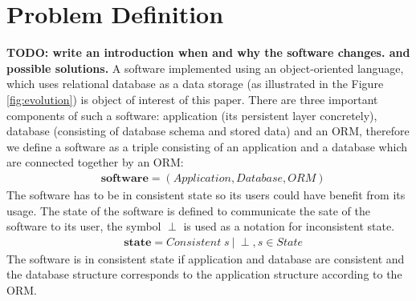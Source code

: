 \documentclass[11pt]{article}
\begin{document}
\section{Problem Definition} 
\label{sec:problem}
\textbf{TODO: write an introduction when and why the software changes. and possible solutions.}
A software implemented using an object-oriented language, which uses relational database as a data storage (as illustrated in the Figure \ref{fig:evolution}) is object of interest of this paper. There are three important components of such a software: application (its persistent layer concretely), database (consisting of database schema and stored data) and an ORM, therefore we define a software as a triple consisting of an application and a database which are connected together by an ORM:
\begin{align*}
& \mathbf{software} = ( Application, Database, ORM )
\end{align*}
The software has to be in consistent state so its users could have benefit from its usage. The state of the software is defined to communicate the sate of the software to its user, the symbol $\perp$ is used as a notation for inconsistent state. 
\begin{align*}
& \mathbf{state} = Consistent\; s \: | \: \perp, s \in State 
\end{align*}
The software is in consistent state if application and database are consistent and the database structure corresponds to the application structure according to the ORM.
\end{document}

